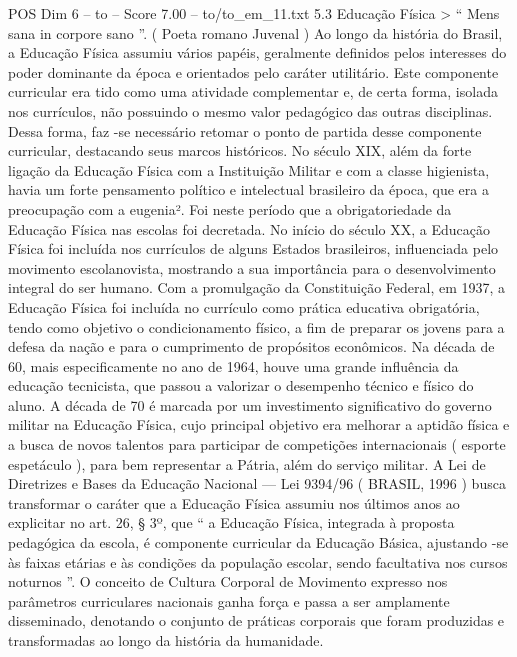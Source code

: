 \begin{textsample}{POS Dim 6 – to – Score 7.00 – to/to\_em\_11.txt}  \label{ex:f6_pos_177}
5.3 Educação Física > “ Mens sana in corpore sano ”. ( Poeta romano Juvenal ) Ao longo da história do Brasil, a Educação Física assumiu vários papéis, geralmente definidos pelos interesses do poder dominante da época e orientados pelo caráter utilitário.
Este componente curricular era tido como uma atividade complementar e, de certa forma, isolada nos currículos, não possuindo o mesmo valor pedagógico das outras disciplinas.
Dessa forma, faz -se necessário retomar o ponto de partida desse componente curricular, destacando seus marcos históricos.
No século XIX, além da forte ligação da Educação Física com a Instituição Militar e com a classe higienista, havia um forte pensamento político e intelectual brasileiro da época, que era a preocupação com a eugenia².
Foi neste período que a obrigatoriedade da Educação Física nas escolas foi decretada.
No início do século XX, a Educação Física foi incluída nos currículos de alguns Estados brasileiros, influenciada pelo movimento escolanovista, mostrando a sua importância para o desenvolvimento integral do ser humano.
Com a promulgação da Constituição Federal, em 1937, a Educação Física foi incluída no currículo como prática educativa obrigatória, tendo como objetivo o condicionamento físico, a fim de preparar os jovens para a defesa da nação e para o cumprimento de propósitos econômicos.
Na década de 60, mais especificamente no ano de 1964, houve uma grande influência da educação tecnicista, que passou a valorizar o desempenho técnico e físico do aluno.
A década de 70 é marcada por um investimento significativo do governo militar na Educação Física, cujo principal objetivo era melhorar a aptidão física e a busca de novos talentos para participar de competições internacionais ( esporte espetáculo ), para bem representar a Pátria, além do serviço militar.
A Lei de Diretrizes e Bases da Educação Nacional — Lei 9394/96 ( BRASIL, 1996 ) busca transformar o caráter que a Educação Física assumiu nos últimos anos ao explicitar no art. 26, § 3º, que “ a Educação Física, integrada à proposta pedagógica da escola, é componente curricular da Educação Básica, ajustando -se às faixas etárias e às condições da população escolar, sendo facultativa nos cursos noturnos ”.
O conceito de Cultura Corporal de Movimento expresso nos parâmetros curriculares nacionais ganha força e passa a ser amplamente disseminado, denotando o conjunto de práticas corporais que foram produzidas e transformadas ao longo da história da humanidade.

\end{textsample}
